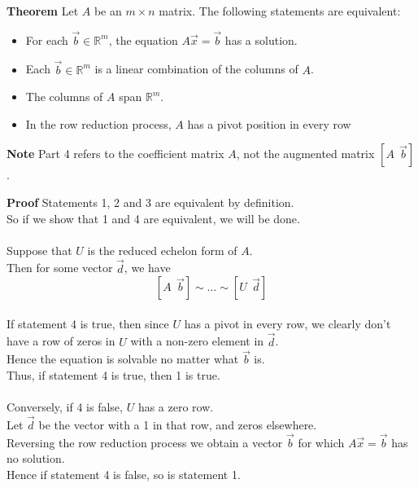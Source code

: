   \begin{frame}[fragile]
\textbf{Theorem}
Let $A$ be an $m \times n$ matrix. The following statements are equivalent:
\begin{itemize}
 \item For each $\vec{b}\in \mathbb R^m$, the equation $A\vec{x}=\vec{b}$ has a solution.
 \item Each $\vec{b} \in \mathbb R^m$ is a linear combination of the columns of $A$.
 \item The columns of $A$ span $\mathbb R^m$.
 \item In the row reduction process, $A$ has a pivot position in every row
\end{itemize}


\textbf{Note}
Part 4 refers to the coefficient matrix $A$, not the augmented matrix $[A \ \  \vec{b}]$.

\end{frame}

  \begin{frame}[fragile]
\textbf{Proof}
Statements 1, 2 and 3 are equivalent by definition. \\ 
So if we show that 1 and 4 are 
equivalent, we will be done.  \\ 

\ \\
Suppose that $U$ is the reduced echelon form of $A$.  \\ 
Then for some vector $\vec{d}$, we have
\[
  [ A\ \  \vec{b}] \sim \dots \sim [ U \ \ \vec{d} ]
\]  \\ 
If statement 4 is true, then since $U$ has a pivot in every row,
we clearly don't have a row of zeros in $U$ with a non-zero element in $\vec{d}$. \\ 
Hence the equation is solvable no matter what $\vec{b}$ is.  \\  
Thus, if statement 4 is true, then 1 is true.  \\ 

\ \\ 
Conversely, if 4 is false, $U$ has a zero row.   \\ 
Let $\vec{d}$ be the vector with a 
1 in that row, and zeros elsewhere.  \\ 
Reversing the row reduction process we obtain a
vector $\vec{b}$ for which $A \vec{x} = \vec{b}$ has no solution.   \\ 
Hence if statement 4 is false, so is statement 1.

\end{frame}

